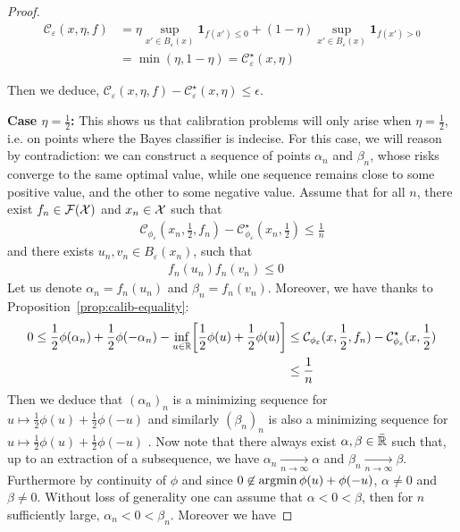 \begin{proof}
    \begin{align*}
       \mathcal{C}_{\varepsilon}(x,\eta,f)& = \eta \sup_{x'\in B_\varepsilon(x)} \mathbf{1}_{f(x')\leq 0 } +(1-\eta) \sup_{x'\in B_\varepsilon(x)} \mathbf{1}_{f(x')> 0 }\\
       & = \min(\eta,1-\eta)
        = \mathcal{C}_{\varepsilon}^\star(x,\eta)
    \end{align*}
    
    
    Then we deduce, $\mathcal{C}_{\varepsilon}(x,\eta,f) - \mathcal{C}_{\varepsilon}^\star(x,\eta)\leq \epsilon$.
    
    \medskip
    
    \textbf{Case $\eta=\frac12$:} This shows us that calibration problems will only arise when $\eta = \frac{1}{2}$, i.e. on points where the Bayes classifier is indecise. For this case, we will reason by contradiction: we can construct a sequence of points $\alpha_n$ and $\beta_n$, whose risks converge to the same optimal value, while one sequence remains close to some positive value, and the other to some negative value. Assume that for all $n$, there exist $f_n\in\mathcal{F}(\mathcal{X})$ and $x_n\in\mathcal{X}$ such that 
    \begin{align*}
        \mathcal{C}_{\phi_\varepsilon}(x_n,\frac12,f_n) - \mathcal{C}_{\phi_\varepsilon}^\star(x_n,\frac12)\leq \frac1n 
    \end{align*}
    and there exists $u_n,v_n\in B_\varepsilon(x_n)$, such that 
    \begin{align*}
        f_n(u_n)f_n(v_n)\leq 0\quad 
    \end{align*} 
    Let us denote $\alpha_n = f_n(u_n)$ and $\beta_n = f_n(v_n)$. %
    Moreover, we have thanks to Proposition~\ref{prop:calib-equality}:
    \begin{align*}
      0\leq \frac12 \phi(\alpha_n) +  \frac12 \phi(-\alpha_n)- \inf_{u\in\RR}\left[\frac12 \phi(u)+\frac12\phi(u)\right]&\leq \mathcal{C}_{\phi_\varepsilon}(x,\frac12,f_n) - \mathcal{C}_{\phi_\varepsilon}^\star(x,\frac12)\\
      &\leq \frac1n
    \end{align*}
    Then we deduce that $(\alpha_n)_n$ is a minimizing sequence for  $u\mapsto\frac12\phi(u)+\frac12\phi(-u)$ and similarly $(\beta_n)_n$ is also a minimizing sequence for  $u\mapsto\frac12\phi(u)+\frac12\phi(-u)$ . Now note that there always exist $\alpha, \beta\in \bar{\mathbb{R}}$ such that, up to an extraction of a subsequence, we have $\alpha_n\xrightarrow[n\to\infty]{} \alpha$ and $\beta_n \xrightarrow[n\to\infty]{} \beta$. Furthermore by continuity of $\phi$ and since $0\not\in\operatorname*{argmin}\phi(u)+\phi(-u)$, $\alpha\neq0$ and $\beta\neq 0$. Without loss of generality one can assume that $\alpha<0<\beta$, then for $n$ sufficiently large, $\alpha_n<0<\beta_n$. Moreover we have 

\end{proof}
